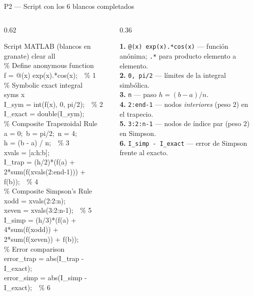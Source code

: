 \documentclass[aspectratio=169,10pt]{beamer}
\begin{document}
\begin{frame}{P2 — Script con los 6 blancos completados}
\begin{columns}[T]
\begin{column}{0.62\textwidth}
\begin{cardgear}{Script MATLAB (blancos en granate)}{\faCode}
{\scriptsize\ttfamily
clear all\\
\% Define anonymous function\\
f = @({\color{Granate}x}) {\color{Granate}exp(x).*cos(x)};\ \ \% 1\\[0.4mm]
\% Symbolic exact integral\\
syms x\\
I\_sym = int(f(x), {\color{Granate}0, pi/2});\ \ \% 2\\
I\_exact = double(I\_sym);\\
\% Composite Trapezoidal Rule\\
a = 0;\ b = pi/2;\ n = 4;\\
h = (b - a) / {\color{Granate}n};\ \ \% 3\\
xvals = [a:h:b];\\
I\_trap = (h/2)*(f(a) + 2*sum(f(xvals({\color{Granate}2:end-1}))) + f(b));\ \ \% 4\\[0.4mm]
\% Composite Simpson's Rule\\
xodd = xvals(2:2:n);\\
xeven = xvals({\color{Granate}3:2:n-1});\ \ \% 5\\
I\_simp = (h/3)*(f(a) + 4*sum(f(xodd)) + 2*sum(f(xeven)) + f(b));\\
\% Error comparison\\
error\_trap = abs(I\_trap - I\_exact);\\
error\_simp = abs({\color{Granate}I\_simp - I\_exact});\ \ \% 6
}
\end{cardgear}
\end{column}
\begin{column}{0.36\textwidth}
\begin{cardnota}[\faListOl]
{\scriptsize
\textbf{1.} \texttt{@(x) exp(x).*cos(x)} — función anónima; \texttt{.*} para producto elemento a elemento.\\[0.6mm]
\textbf{2.} \texttt{0, pi/2} — límites de la integral simbólica.\\[0.6mm]
\textbf{3.} \texttt{n} — paso $h=(b-a)/n$.\\[0.6mm]
\textbf{4.} \texttt{2:end-1} — nodos \emph{interiores} (peso $2$) en el trapecio.\\[0.6mm]
\textbf{5.} \texttt{3:2:n-1} — nodos de índice par (peso $2$) en Simpson.\\[0.6mm]
\textbf{6.} \texttt{I\_simp - I\_exact} — error de Simpson frente al exacto.}
\end{cardnota}
\end{column}
\end{columns}
\end{frame}
\end{document}
